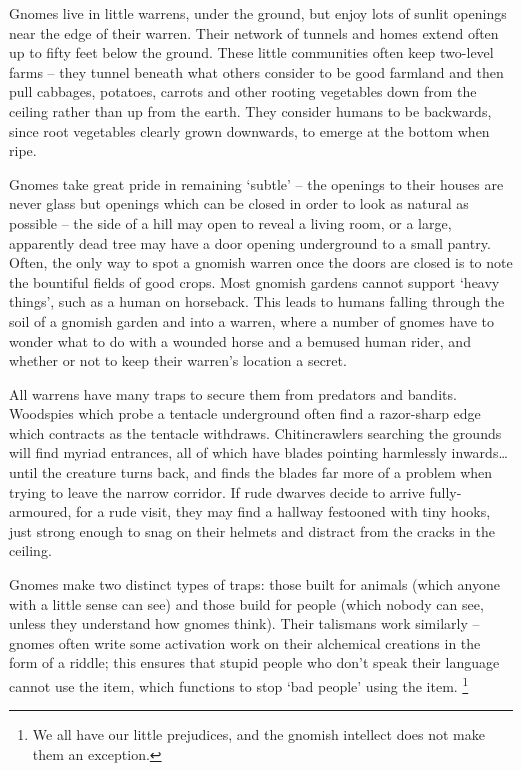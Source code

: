 \begin{multicols}{2}
\renewcommand\npcsymbol{\Gn}


\noindent
Gnomes live in little warrens, under the ground, but enjoy lots of sunlit openings near the edge of their warren.
Their network of tunnels and homes extend often up to fifty feet below the ground.
These little communities often keep two-level farms -- they tunnel beneath what others consider to be good farmland and then pull cabbages, potatoes, carrots and other rooting vegetables down from the ceiling rather than up from the earth.
They consider humans to be backwards, since root vegetables clearly grown downwards, to emerge at the bottom when ripe.

Gnomes take great pride in remaining `subtle' -- the openings to their houses are never glass but openings which can be closed in order to look as natural as possible -- the side of a hill may open to reveal a living room, or a large, apparently dead tree may have a door opening underground to a small pantry.
Often, the only way to spot a gnomish warren once the doors are closed is to note the bountiful fields of good crops.
Most gnomish gardens cannot support `heavy things', such as a human on horseback.
This leads to humans falling through the soil of a gnomish garden and into a warren, where a number of gnomes have to wonder what to do with a wounded horse and a bemused human rider, and whether or not to keep their warren's location a secret.

All warrens have many traps to secure them from predators and bandits.
Woodspies which probe a tentacle underground often find a razor-sharp edge which contracts as the tentacle withdraws.
Chitincrawlers searching the grounds will find myriad entrances, all of which have blades pointing harmlessly inwards\ldots until the creature turns back, and finds the blades far more of a problem when trying to leave the narrow corridor.
If rude dwarves decide to arrive fully-armoured, for a rude visit, they may find a hallway festooned with tiny hooks, just strong enough to snag on their helmets and distract from the cracks in the ceiling.

Gnomes make two distinct types of traps: those built for animals (which anyone with a little sense can see) and those build for people (which nobody can see, unless they understand how gnomes think).
Their \glspl{talisman} work similarly -- gnomes often write some activation work on their alchemical creations in the form of a riddle; this ensures that stupid people who don't speak their language cannot use the item, which functions to stop `bad people' using the item.%
\footnote{We all have our little prejudices, and the gnomish intellect does not make them an exception.}


\end{multicols}
